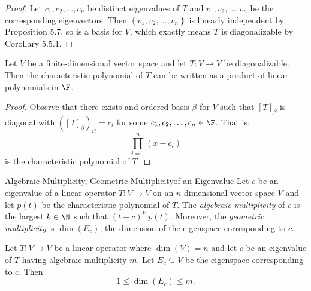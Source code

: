 \documentclass[linearalgebraI]{subfiles}
\begin{document}
    \begin{proof}
        Let $c_1, c_2, \ldots, c_n$ be distinct eigenvalues of $T$ and $v_1, v_2, \ldots, v_n$ be the corresponding eigenvectors. Then $\left\lbrace v_1, v_2, \ldots, v_n \right\rbrace$ is linearly independent by Proposition 5.7, so is a basis for $V$, which exactly means $T$ is diagonalizable by Corollary 5.5.1.
    \end{proof}

    \begin{prop}{}
        Let $V$ be a finite-dimensional vector space and let $T:V\to V$ be diagonalizable. Then the characteristic polynomial of $T$ can be written as a product of linear polynomials in $\F$.
    \end{prop}

    \begin{proof}
        Observe that there exists and ordered basis $\beta$ for $V$ such that $[T]_\beta$ is diagonal with $\left( \left[ T \right] _\beta \right) _{ii} = c_i$ for some $c_1,c_2,\ldots,c_n\in\F$. That is,
        \begin{equation*}
            \prod^{n}_{i=1} \left( x-c_i \right) 
        \end{equation*}
        is the characteristic polynomial of $T$.
    \end{proof}

    \begin{definition}{Algebraic Multiplicity, Geometric Multiplicity}{of an Eigenvalue}
        Let $c$ be an eigenvalue of a linear operator $T:V\to V$ on an $n$-dimensional vector space $V$ and let $p(t)$ be the characteristic polynomial of $T$. The \emph{algebraic multiplicity} of $c$ is the largest $k\in \N$ such that $(t-c)^k|p(t)$. Moreover, the \emph{geometric multiplicity} is $\dim \left( E_c \right)$, the dimension of the eigenspace corresponding to $c$.
    \end{definition}

    \clearpage
    \begin{prop}{}
        Let $T:V\to V$ be a linear operator where $\dim(V) = n$ and let $c$ be an eigenvalue of $T$ having algebraic multiplicity $m$. Let $E_c\subseteq V$ be the eigenspace corresponding to $c$. Then
        \begin{equation*}
            1\leq \dim \left( E_c \right)\leq m.
        \end{equation*}
    \end{prop}
\end{document}
